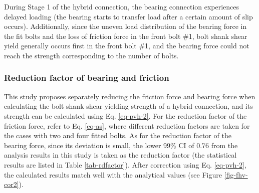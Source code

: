 During Stage 1 of the hybrid connection, the bearing connection experiences delayed loading (the bearing starts to transfer load after a certain amount of slip occurs). Additionally, since the uneven load distribution of the bearing force in the fit bolts and the loss of friction force in the front bolt \#1, bolt shank shear yield generally occurs first in the front bolt \#1, and the bearing force could not reach the strength corresponding to the number of bolts.





\subsubsection*{Reduction factor of bearing and friction}


This study proposes separately reducing the friction force and bearing force when calculating the bolt shank shear yielding strength of a hybrid connection, and its strength can be calculated using Eq. \ref{eq-pvh-2}. For the reduction factor of the friction force, refer to Eq. \ref{eq-as}, where different reduction factors are taken for the cases with two and four fitted bolts. As for the reduction factor of the bearing force, since its deviation is small, the lower 99\% CI of 0.76 from the analysis results in this study is taken as the reduction factor (the statistical results are listed in Table \ref{tab-rdfactor}). After correction using Eq. \ref{eq-pvh-2}, the calculated results match well with the analytical values (see Figure \ref{fig-fhv-cor2}).